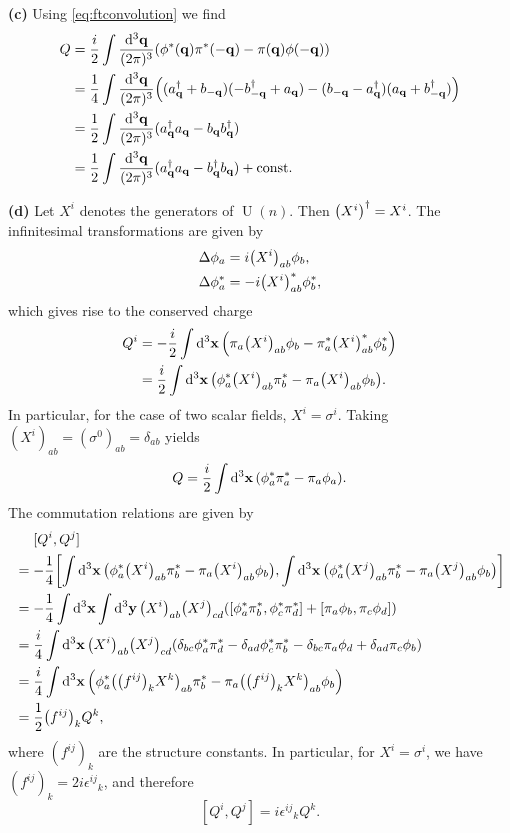 \documentclass{article}
\makeatletter
\newcommand*{\shifttext}[1]{%
  \settowidth{\@tempdima}{#1}%
  \hspace{-\@tempdima}#1%
}
\newcommand{\plabel}[1]{%
\shifttext{\textbf{#1}\quad}%
}
\makeatother
\begin{document}
\plabel{(c)}%
Using \eqref{eq:ftconvolution} we find
\begin{align*}
    Q &=  \frac{i}{2} \int \frac{\dd{^3 \vb{q}}}{(2\pi)^3} \qty(\phi^*(\vb{q})\pi^*(-\vb{q}) - \pi(\vb{q})\phi(-\vb{q})) \\
    &= \frac{1}{4} \int \frac{\dd{^3 \vb{q}}}{(2\pi)^3}\qty((a^\dagger_{\vb{q}} + b_{-\vb{q}})(-b^\dagger_{-\vb{q}} + a_{\vb{q}}) - (b_{-\vb{q}} - a^\dagger_{\vb{q}})(a_{\vb{q}} + b^\dagger_{-\vb{q}})) \\
    &= \frac{1}{2} \int \frac{\dd{^3 \vb{q}}}{(2\pi)^3} (a^\dagger_{\vb{q}}a_{\vb{q}} - b_{\vb{q}}b^\dagger_{\vb{q}}) \\
    &= \frac{1}{2} \int \frac{\dd{^3 \vb{q}}}{(2\pi)^3} (a^\dagger_{\vb{q}}a_{\vb{q}} - b^\dagger_{\vb{q}}b_{\vb{q}}) + \mathrm{const}.
\end{align*}

\plabel{(d)}%
Let $X^i$ denotes the generators of $\operatorname{U}(n)$.
Then $\qty(X^i)^\dagger = X^i$.
The infinitesimal transformations are given by
\begin{align*}
    \Delta\phi_a &= i\qty(X^i)_{ab} \phi_b, \\
    \Delta\phi^*_a &= -i\qty(X^i)^*_{ab} \phi^*_b,
\end{align*}
which gives rise to the conserved charge
\begin{align*}
    Q^i &= -\frac{i}{2} \int \dd{^3\vb{x}} \qty(\pi_a \qty(X^i)_{ab} \phi_b - \pi^*_a \qty(X^i)^*_{ab} \phi^*_b) \\
    &= \frac{i}{2} \int \dd{^3\vb{x}} \qty(\phi^*_a \qty(X^i)_{ab} \pi^*_b - \pi_a \qty(X^i)_{ab} \phi_b).
\end{align*}
In particular, for the case of two scalar fields, $X^i = \sigma^i$.
Taking $(X^i)_{ab} = (\sigma^0)_{ab} = \delta_{ab}$ yields
\[ Q = \frac{i}{2} \int \dd{^3\vb{x}} \qty(\phi^*_a \pi^*_a - \pi_a \phi_a). \]
The commutation relations are given by
\begin{align*}
    &{\phantom{{}={}}} [Q^i,Q^j] \\
    &= -\frac{1}{4} \qty[\int \dd{^3\vb{x}} \qty(\phi^*_a \qty(X^i)_{ab} \pi^*_b - \pi_a \qty(X^i)_{ab} \phi_b), \int \dd{^3\vb{x}} \qty(\phi^*_a \qty(X^j)_{ab} \pi^*_b - \pi_a \qty(X^j)_{ab} \phi_b)] \\
    &= -\frac{1}{4} \int \dd{^3\vb{x}} \int \dd{^3\vb{y}} \qty(X^i)_{ab} \qty(X^j)_{cd}\qty([\phi^*_a \pi^*_b, \phi^*_c \pi^*_d] + [\pi_a \phi_b, \pi_c \phi_d]) \\
    &= \frac{i}{4} \int \dd{^3 \vb{x}} \qty(X^i)_{ab} \qty(X^j)_{cd}\qty(\delta_{bc}\phi^*_a \pi^*_d - \delta_{ad}\phi^*_c \pi^*_b - \delta_{bc} \pi_a \phi_d + \delta_{ad}\pi_c\phi_b) \\
    &= \frac{i}{4} \int \dd{^3\vb{x}} \qty(\phi^*_a\qty(\qty(f^{ij})_{k}X^k)_{ab}\pi^*_b - \pi_a\qty(\qty(f^{ij})_{k}X^k)_{ab}\phi_b) \\
    &= \frac{1}{2} \qty(f^{ij})_k Q^k,
\end{align*}
where $(f^{ij})_k$ are the structure constants.
In particular, for $X^i = \sigma^i$, we have $(f^{ij})_k = 2i{\epsilon^{ij}}_k$, and therefore
\[ [Q^i,Q^j] = i{\epsilon^{ij}}_k Q^k. \]
\end{document}
